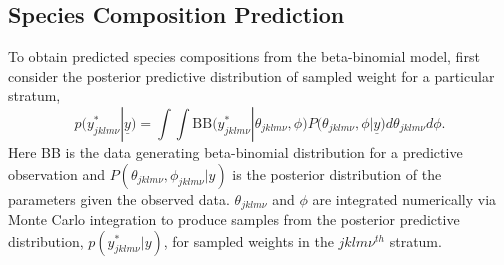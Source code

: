 \documentclass[12pt]{article}
\begin{document}


%
%
\subsection{Species Composition Prediction}\label{prediction}
%
%


%
To obtain predicted species compositions from the beta-binomial model, first 
consider the posterior predictive distribution of sampled weight for a 
particular stratum,
%
\[p(y^*_{jklm\nu}|\underline{y}) = \int\!\!\!\!\int\! \text{BB}\Big( y^*_{jklm\nu}|\theta_{jklm\nu}, \phi \Big) P\Big(\theta_{jklm\nu}, \phi | \underline{y}\Big) d\theta_{jklm\nu} d\phi.\]
%
Here BB is the data generating beta-binomial distribution for a
predictive observation and \(P(\theta_{jklm\nu}, \phi_{jklm\nu}|y)\)
is the posterior distribution of the parameters given the observed data.
\(\theta_{jklm\nu}\) and \(\phi\) are integrated numerically via 
Monte Carlo integration to produce samples from the posterior predictive 
distribution, \(p(y^*_{jklm\nu}|y)\), for sampled weights in the 
\(jklm\nu^{th}\) stratum.  
\end{document}
